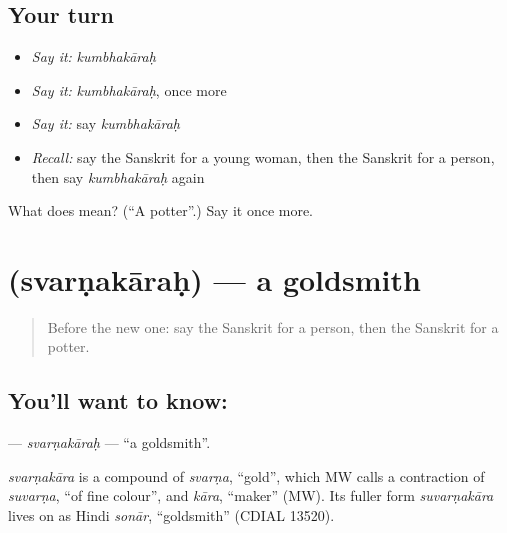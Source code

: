 \subsection*{Your turn}
\begin{itemize}
\raggedright
  \item \emph{Say it:} \emph{kumbhakāraḥ}
  \item \emph{Say it:} \emph{kumbhakāraḥ}, once more
  \item \emph{Say it:} say \emph{kumbhakāraḥ}
  \item \emph{Recall:} say the Sanskrit for a young woman, then the Sanskrit for a person, then say \emph{kumbhakāraḥ} again
\end{itemize}

\begin{tcolorbox}[breakable,colback=teal!4,colframe=teal!35!black,title={Before you move on}]
What does  mean? (\textquotedblleft{}A potter\textquotedblright{}.) Say it once more.
\end{tcolorbox}
\section[\texorpdfstring{\sk{स्वर्णकारः} (svarṇakāraḥ)}{स्वर्णकारः (svarṇakāraḥ)}]{ (svarṇakāraḥ) — a goldsmith}

\label{lesson:SA-C237-svarnakarah}



\begin{quote}
Before the new one: say the Sanskrit for a person, then the Sanskrit for a potter.
\end{quote}

\subsection*{You'll want to know: }
\textbf{} — \emph{svarṇakāraḥ} — \textquotedblleft{}a goldsmith\textquotedblright{}.

\begin{cousinweb}
\emph{svarṇakāra} is a compound of \emph{svarṇa}, \textquotedblleft{}gold\textquotedblright{}, which MW calls a contraction of \emph{suvarṇa}, \textquotedblleft{}of fine colour\textquotedblright{}, and \emph{kāra}, \textquotedblleft{}maker\textquotedblright{} (MW). Its fuller form \emph{suvarṇakāra} lives on as Hindi \emph{sonār}, \textquotedblleft{}goldsmith\textquotedblright{} (CDIAL 13520).
\end{cousinweb}

